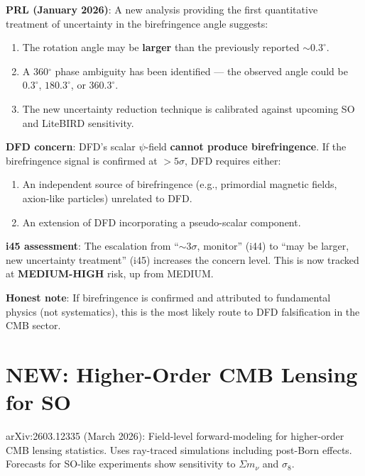 \documentclass[11pt,a4paper]{article}
\newcommand{\NEW}{\textcolor{dfdblue}{\textbf{NEW}}}
\begin{document}
\begin{tcolorbox}[colback=red!5!white, colframe=red!60!black,
  title={ESCALATED: Cosmic Birefringence May Be Larger Than Previously Reported}]

\textbf{PRL (January 2026)}: A new analysis providing the first quantitative treatment of uncertainty in the birefringence angle suggests:
\begin{enumerate}
\item The rotation angle may be \textbf{larger} than the previously reported $\sim 0.3^\circ$.
\item A 360$^\circ$ phase ambiguity has been identified --- the observed angle could be $0.3^\circ$, $180.3^\circ$, or $360.3^\circ$.
\item The new uncertainty reduction technique is calibrated against upcoming SO and LiteBIRD sensitivity.
\end{enumerate}

\textbf{DFD concern}: DFD's scalar $\psi$-field \textbf{cannot produce birefringence}. If the birefringence signal is confirmed at $> 5\sigma$, DFD requires either:
\begin{enumerate}
\item An independent source of birefringence (e.g., primordial magnetic fields, axion-like particles) unrelated to DFD.
\item An extension of DFD incorporating a pseudo-scalar component.
\end{enumerate}

\textbf{i45 assessment}: The escalation from ``$\sim 3\sigma$, monitor'' (i44) to ``may be larger, new uncertainty treatment'' (i45) increases the concern level. This is now tracked at \textbf{MEDIUM-HIGH} risk, up from MEDIUM.

\textbf{Honest note}: If birefringence is confirmed and attributed to fundamental physics (not systematics), this is the most likely route to DFD falsification in the CMB sector.
\end{tcolorbox}

\section{\NEW: Higher-Order CMB Lensing for SO}

arXiv:2603.12335 (March 2026): Field-level forward-modeling for higher-order CMB lensing statistics. Uses ray-traced simulations including post-Born effects. Forecasts for SO-like experiments show sensitivity to $\Sigma m_\nu$ and $\sigma_8$.
\end{document}
